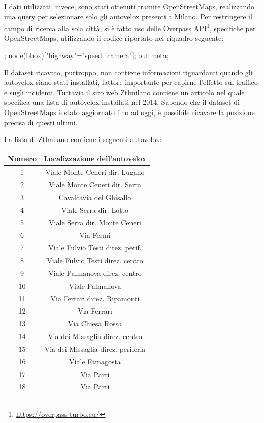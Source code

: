 \documentclass[a4paper,12pt]{report}
\begin{document}
I dati utilizzati, invece, sono stati ottenuti tramite OpenStreetMaps, 
realizzando una query per selezionare solo gli autovelox presenti a Milano. 
Per restringere il campo di ricerca alla sola città, si è fatto uso delle 
Overpass API\footnote{\url{https://overpass-turbo.eu/}}, 
specifiche per OpenStreetMaps, utilizzando il codice riportato nel riquadro seguente: 

\begin{code}
;
node({{bbox}})["highway"="speed_camera"];
out meta;
\end{code}

Il dataset ricavato, purtroppo, non contiene informazioni riguardanti quando gli 
autovelox siano stati installati, fattore importante per capirne l'effetto 
sul traffico e sugli incidenti. 
Tuttavia il sito web Ztlmilano \cite{ZTLMILANO:1}
contiene un articolo nel quale specifica una lista di 
autovelox installati nel 2014. 
Sapendo che il dataset di OpenStreetMaps è stato aggiornato fino ad oggi, 
è possibile ricavare la posizione precisa di questi ultimi. 

La lista di Ztlmilano contiene i seguenti autovelox: 

\begin{center}
    \def\arraystretch{1.5}%
    \begin{tabular}{ |c|c| } 
    \hline
    Numero & Localizzazione dell'autovelox \\ 
    \hline
    \rowcolor{TableGray}
    1   &   Viale Monte Ceneri  dir. Lugano\\
    2   &   Viale Monte Ceneri dir. Serra\\
    \rowcolor{TableGray}
    3   &   Cavalcavia del Ghisallo\\
    4   &   Viale Serra dir. Lotto\\
    \rowcolor{TableGray}
    5   &   Viale Serra dir. Monte Ceneri\\
    6   &   Via Fermi\\
    \rowcolor{TableGray}
    7   &   Viale Fulvio Testi direz. perif.\\
    8   &   Viale Fulvio Testi direz. centro\\
    \rowcolor{TableGray}
    9   &   Viale Palmanova  direz. centro\\
    10  &   Viale Palmanova\\
    \rowcolor{TableGray}
    11  &   Via Ferrari direz. Ripamonti\\
    12  &   Via Ferrari\\
    \rowcolor{TableGray}
    13  &   Via Chiesa Rossa\\
    14  &   Via dei Missaglia direz. centro\\
    \rowcolor{TableGray}
    15  &   Via dei Missaglia direz. periferia\\
    16  &   Viale Famagosta\\
    \rowcolor{TableGray}
    17  &   Via Parri\\
    18  &   Via Parri\\
    \hline
    \end{tabular}
    \label{ztl-milano}
\end{center}
\end{document}
